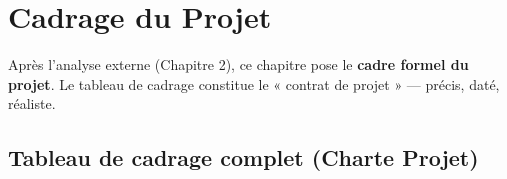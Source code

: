 
\chapter{Cadrage du Projet}

Après l'analyse externe (Chapitre 2), ce chapitre pose le \textbf{cadre formel du projet}. Le tableau de cadrage constitue le « contrat de projet » — précis, daté, réaliste.

\section{Tableau de cadrage complet (Charte Projet)}

